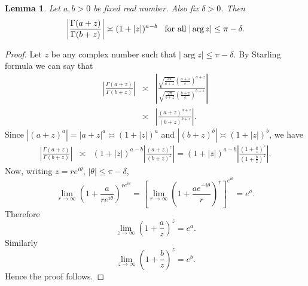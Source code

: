\documentclass[11pt,reqno]{amsart}
\newtheorem{lemma}[theorem]{Lemma}
\theoremstyle{definition}
\theoremstyle{definition}
\numberwithin{equation}{section}
\begin{document}
\begin{lemma}\label{gamma-1}
Let $a, b>0$ be fixed real number. Also fix $\delta>0$. Then
$$
\left|\frac{\Gamma(a+z)}{\Gamma(b+z)}\right|\asymp (1+|z|)^{a-b}\hspace{3mm}\textup{for all}\hspace{1mm}|\arg z|\leq\pi-\delta.
$$


\end{lemma}
\begin{proof}
Let $z$ be any complex number such that $|\arg z|\leq\pi-\delta$. By Starling formula we can say that
\begin{eqnarray*}
\left|\frac{\Gamma(a+z)}{\Gamma(b+z)}\right|&\asymp& \left|\frac{\sqrt{\frac{2\pi}{a+z}}(\frac{a+z}{e})^{a+z}}{\sqrt{\frac{2\pi}{b+z}}(\frac{b+z}{e})^{b+z}}\right|\\
&\asymp & \left|\frac{(a+z)^{a+z}}{(b+z)^{b+z}}\right|.
\end{eqnarray*}
Since $|(a+z)^a|=|a+z|^a\asymp(1+|z|)^a$ and $|(b+z)^b|\asymp (1+|z|)^b$, we have
 \begin{eqnarray*}
\left|\frac{\Gamma(a+z)}{\Gamma(b+z)}\right|
&\asymp & (1+|z|)^{a-b}\left|\frac{(a+z)^{z}}{(b+z)^{z}}\right|= (1+|z|)^{a-b}\left|\frac{(1+\frac{a}{z})^z}{(1+\frac{b}{z})^{z}}\right|.
\end{eqnarray*}
Now, writing $z=re^{i\theta}$, $|\theta|\leq\pi-\delta$,
$$
\lim_{r\rightarrow\infty}\left(1+\frac{a}{re^{i\theta}}\right)^{re^{i\theta}}=
\left[\lim_{r\rightarrow\infty}\left(1+\frac{ae^{-i\theta}}{r}\right)^{r}\right]^{e^{i\theta}}=e^a.
$$
Therefore
$$ 
\lim_{z\rightarrow\infty}\left(1+\frac{a}{z}\right)^{z}=e^a.
$$
Similarly
$$ 
\lim_{z\rightarrow\infty}\left(1+\frac{b}{z}\right)^{z}=e^b.
$$
Hence the proof follows.
\end{proof}
\end{document}
